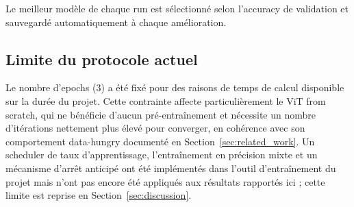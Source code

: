 Le meilleur modèle de chaque run est sélectionné selon l'accuracy de
validation et sauvegardé automatiquement à chaque amélioration.

\subsection{Limite du protocole actuel}

Le nombre d'epochs (3) a été fixé pour des raisons de temps de calcul
disponible sur la durée du projet. Cette contrainte affecte
particulièrement le ViT from scratch, qui ne bénéficie d'aucun
pré-entraînement et nécessite un nombre d'itérations nettement plus
élevé pour converger, en cohérence avec son comportement data-hungry
documenté en Section~\ref{sec:related_work}. Un scheduler de taux
d'apprentissage, l'entraînement en précision mixte et un mécanisme
d'arrêt anticipé ont été implémentés dans l'outil d'entraînement du
projet mais n'ont pas encore été appliqués aux résultats rapportés
ici ; cette limite est reprise en Section~\ref{sec:discussion}.